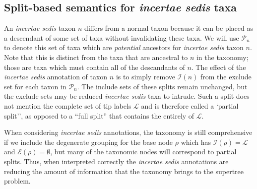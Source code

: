 \documentclass[english]{article}
\begin{document}
\subsection{Split-based semantics for \emph{incertae sedis} taxa}

An \emph{incertae sedis} taxon $n$ differs from a normal taxon because it can be
placed as a descendant of some set of taxa without invalidating these taxa.
We will use $\mathcal{P}_n$ to denote this set of taxa which are {\emph{potential}} 
ancestors for \emph{incertae sedis} taxon $n$.
Note that this is distinct from the taxa that are ancestral to $n$ in the taxonomy;
    those are taxa which must contain all of the descandants of $n$.
The effect of the \emph{incertae sedis} annotation of taxon $n$ is
    to simply remove $\mathcal{I}(n)$ from the exclude set for each taxon in $\mathcal{P}_n$.
The include sets of these splits remain unchanged, but the exclude sets may be reduced
\emph{incertae sedis} taxa to intrude.
Such a split does
not mention the complete set of tip labels $\mathcal{L}$ and is therefore called a
`partial split'', as opposed to a ``full split'' that contains the entirely of $\mathcal{L}$.

When considering \emph{incertae sedis} annotations, the taxonomy is still comprehensive 
if we include the degenerate grouping for the base
    node $\rho$ which has $\mathcal{I}(\rho) = \mathcal{L}$ and $\mathcal{E}(\rho) = \emptyset$,
    but many of the taxonomic nodes will correspond to partial splits.
Thus, when interpreted correctly the \emph{incertae sedis} 
annotations are reducing the amount of information that the taxonomy brings to
the supertree problem.


\end{document}

